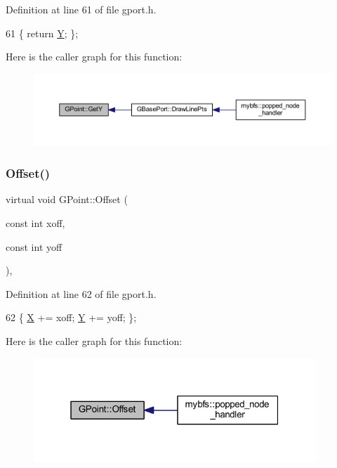 Definition at line 61 of file gport.\+h.


\begin{DoxyCode}
61 \{ \textcolor{keywordflow}{return} \mbox{\hyperlink{class_g_point_aca224bb9b30fab3b59cd25a9261c1069}{Y}}; \};
\end{DoxyCode}
Here is the caller graph for this function\+:\nopagebreak
\begin{figure}[H]
\begin{center}
\leavevmode
\includegraphics[width=350pt]{class_g_point_a0b40736448fc178ac2406875bd524a2c_icgraph}
\end{center}
\end{figure}
\mbox{\label{class_g_point_a8098fbfa3ada3a81e07313b2b4de1427}} 
\subsubsection{\texorpdfstring{Offset()}{Offset()}}
{\footnotesize\ttfamily virtual void G\+Point\+::\+Offset (\begin{DoxyParamCaption}\item[{const int}]{xoff,  }\item[{const int}]{yoff }\end{DoxyParamCaption})\hspace{0.3cm}{\ttfamily [inline]}, {\ttfamily [virtual]}}



Definition at line 62 of file gport.\+h.


\begin{DoxyCode}
62 \{ \mbox{\hyperlink{class_g_point_a0a26572e08c37a5e7e6854ae8c7fee66}{X}} += xoff; \mbox{\hyperlink{class_g_point_aca224bb9b30fab3b59cd25a9261c1069}{Y}} += yoff; \};
\end{DoxyCode}
Here is the caller graph for this function\+:\nopagebreak
\begin{figure}[H]
\begin{center}
\leavevmode
\includegraphics[width=301pt]{class_g_point_a8098fbfa3ada3a81e07313b2b4de1427_icgraph}
\end{center}
\end{figure}
\mbox{\label{class_g_point_a7294abba5e2a5a7caa75e3967e07cbb5}} 
